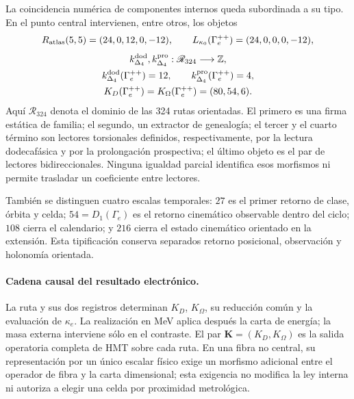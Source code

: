 La coincidencia numérica de componentes internos queda subordinada a su
tipo. En el punto central intervienen, entre otros, los objetos
\[
 R_{\rm atlas}(5,5)=(24,0,12,0,-12),
 \qquad
 L_{\kappa_0}(\Gamma_e^{++})=(24,0,0,0,-12),
\]
\[
 \begin{gathered}
 k_{\Delta_4}^{\rm dod},k_{\Delta_4}^{\rm pro}:
 \mathscr R_{324}\longrightarrow\mathbb Z,\\
 k_{\Delta_4}^{\rm dod}(\Gamma_e^{++})=12,
 \qquad
 k_{\Delta_4}^{\rm pro}(\Gamma_e^{++})=4,\\
 K_D(\Gamma_e^{++})=K_\Omega(\Gamma_e^{++})=(80,54,6).
 \end{gathered}
\]
Aquí \(\mathscr R_{324}\) denota el dominio de las 324 rutas orientadas.
El primero es una firma estática de familia; el segundo, un extractor de
genealogía; el tercer y el cuarto término son lectores torsionales definidos,
respectivamente, por la lectura dodecafásica y por la prolongación prospectiva;
el último objeto es el par de lectores bidireccionales. Ninguna igualdad
parcial identifica esos morfismos ni permite trasladar un coeficiente entre
lectores.

También se distinguen cuatro escalas temporales: \(27\) es el primer retorno
de clase, órbita y celda; \(54=D_1(\Gamma_e)\) es el retorno cinemático
observable dentro del ciclo; \(108\) cierra el calendario; y \(216\) cierra el estado cinemático
orientado en la extensión. Esta tipificación conserva separados retorno
posicional, observación y holonomía orientada.

\paragraph{Cadena causal del resultado electrónico.}
La ruta y sus dos registros determinan \(K_D\), \(K_\Omega\), su reducción
común y la evaluación de \(\kappa_e\). La realización en MeV aplica después
la carta de energía; la masa externa interviene sólo en el contraste. El par
\(\mathbf K=(K_D,K_\Omega)\) es la salida operatoria completa de HMT sobre
cada ruta. En una fibra no central, su representación por un único escalar
físico exige un morfismo adicional entre el operador de fibra y la carta
dimensional; esta exigencia no modifica la ley interna ni autoriza a elegir
una celda por proximidad metrológica.

